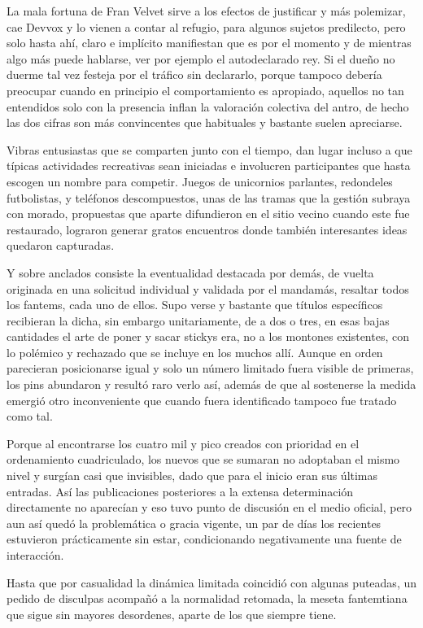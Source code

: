 \documentclass[
]{book}
\begin{document}
La mala fortuna de Fran Velvet sirve a los efectos de justificar y más polemizar, cae Devvox y lo vienen a contar al refugio, para algunos sujetos predilecto, pero solo hasta ahí, claro e implícito manifiestan que es por el momento y de mientras algo más puede hablarse, ver por ejemplo el autodeclarado rey. Si el dueño no duerme tal vez festeja por el tráfico sin declararlo, porque tampoco debería preocupar cuando en principio el comportamiento es apropiado, aquellos no tan entendidos solo con la presencia inflan la valoración colectiva del antro, de hecho las dos cifras son más convincentes que habituales y bastante suelen apreciarse.

Vibras entusiastas que se comparten junto con el tiempo, dan lugar incluso a que típicas actividades recreativas sean iniciadas e involucren participantes que hasta escogen un nombre para competir. Juegos de unicornios parlantes, redondeles futbolistas, y teléfonos descompuestos, unas de las tramas que la gestión subraya con morado, propuestas que aparte difundieron en el sitio vecino cuando este fue restaurado, lograron generar gratos encuentros donde también interesantes ideas quedaron capturadas.

Y sobre anclados consiste la eventualidad destacada por demás, de vuelta originada en una solicitud individual y validada por el mandamás, resaltar todos los fantems, cada uno de ellos. Supo verse y bastante que títulos específicos recibieran la dicha, sin embargo unitariamente, de a dos o tres, en esas bajas cantidades el arte de poner y sacar stickys era, no a los montones existentes, con lo polémico y rechazado que se incluye en los muchos allí. Aunque en orden parecieran posicionarse igual y solo un número limitado fuera visible de primeras, los pins abundaron y resultó raro verlo así, además de que al sostenerse la medida emergió otro inconveniente que cuando fuera identificado tampoco fue tratado como tal.

Porque al encontrarse los cuatro mil y pico creados con prioridad en el ordenamiento cuadriculado, los nuevos que se sumaran no adoptaban el mismo nivel y surgían casi que invisibles, dado que para el inicio eran sus últimas entradas. Así las publicaciones posteriores a la extensa determinación directamente no aparecían y eso tuvo punto de discusión en el medio oficial, pero aun así quedó la problemática o gracia vigente, un par de días los recientes estuvieron prácticamente sin estar, condicionando negativamente una fuente de interacción.

Hasta que por casualidad la dinámica limitada coincidió con algunas puteadas, un pedido de disculpas acompañó a la normalidad retomada, la meseta fantemtiana que sigue sin mayores desordenes, aparte de los que siempre tiene.
\end{document}
